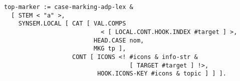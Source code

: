 \documentclass[a4paper]{article}
\begin{document}
{\small\begin{verbatim}
top-marker := case-marking-adp-lex &
  [ STEM < "a" >,
    SYNSEM.LOCAL [ CAT [ VAL.COMPS
                           < [ LOCAL.CONT.HOOK.INDEX #target ] >,
                         HEAD.CASE nom,
                         MKG tp ],
                   CONT [ ICONS <! #icons & info-str &
                                   [ TARGET #target ] !>,
                          HOOK.ICONS-KEY #icons & topic ] ] ].
\end{verbatim}}
\end{document}
